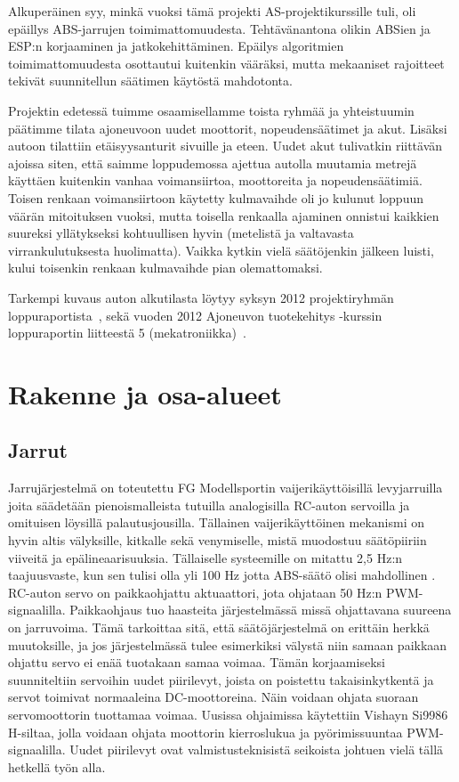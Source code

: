 \documentclass{article}
\begin{document}
Alkuperäinen syy, minkä vuoksi tämä projekti AS-projektikurssille tuli, oli epäillys ABS-jarrujen toimimattomuudesta. Tehtävänantona olikin ABSien ja ESP:n korjaaminen ja jatkokehittäminen. Epäilys algoritmien toimimattomuudesta osottautui kuitenkin vääräksi, mutta mekaaniset rajoitteet tekivät suunnitellun säätimen käytöstä mahdotonta.

Projektin edetessä tuimme osaamisellamme toista ryhmää ja yhteistuumin päätimme tilata ajoneuvoon uudet moottorit, nopeudensäätimet ja akut. Lisäksi autoon tilattiin etäisyysanturit sivuille ja eteen. Uudet akut tulivatkin riittävän ajoissa siten, että saimme loppudemossa ajettua autolla muutamia metrejä käyttäen kuitenkin vanhaa voimansiirtoa, moottoreita ja nopeudensäätimiä. Toisen renkaan voimansiirtoon käytetty kulmavaihde oli jo kulunut loppuun väärän mitoituksen vuoksi, mutta toisella renkaalla ajaminen onnistui kaikkien suureksi yllätykseksi kohtuullisen hyvin (metelistä ja valtavasta virrankulutuksesta huolimatta). Vaikka kytkin vielä säätöjenkin jälkeen luisti, kului toisenkin renkaan kulmavaihde pian olemattomaksi.

Tarkempi kuvaus auton alkutilasta löytyy syksyn 2012 projektiryhmän loppuraportista~\cite{bib:loppuraportti}, sekä vuoden 2012 Ajoneuvon tuotekehitys -kurssin loppuraportin liitteestä 5 (mekatroniikka)~\cite{bib:mekatroniikka}.

\section{Rakenne ja osa-alueet}
\subsection{Jarrut}
Jarrujärjestelmä on toteutettu FG Modellsportin vaijerikäyttöisillä levyjarruilla joita säädetään pienoismalleista tutuilla analogisilla RC-auton servoilla ja omituisen löysillä palautusjousilla. Tällainen vaijerikäyttöinen mekanismi on hyvin altis välyksille, kitkalle sekä venymiselle, mistä muodostuu säätöpiiriin viiveitä ja epälineaarisuuksia. Tällaiselle systeemille on mitattu 2,5 Hz:n taajuusvaste, kun sen tulisi olla yli 100 Hz jotta ABS-säätö olisi mahdollinen \cite{bib:testbed}.
RC-auton servo on paikkaohjattu aktuaattori, jota ohjataan 50 Hz:n PWM-signaalilla. Paikkaohjaus tuo haasteita järjestelmässä missä ohjattavana suureena on jarruvoima. Tämä tarkoittaa sitä, että säätöjärjestelmä on erittäin herkkä muutoksille, ja jos järjestelmässä tulee esimerkiksi välystä niin samaan paikkaan ohjattu servo ei enää tuotakaan samaa voimaa. Tämän korjaamiseksi suunniteltiin servoihin uudet piirilevyt, joista on poistettu takaisinkytkentä ja servot toimivat normaaleina DC-moottoreina. Näin voidaan ohjata suoraan servomoottorin tuottamaa voimaa. Uusissa ohjaimissa käytettiin Vishayn Si9986 \cite{bib:hbridge} H-siltaa, jolla voidaan ohjata moottorin kierroslukua ja pyörimissuuntaa PWM-signaalilla.
Uudet piirilevyt ovat valmistusteknisistä seikoista johtuen vielä tällä hetkellä työn alla.
\end{document}
